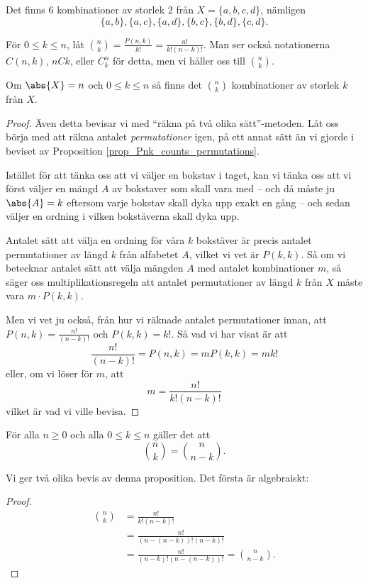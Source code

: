 \documentclass{tufte-handout}
\begin{document}
\begin{example}
	Det finns $6$ kombinationer av storlek $2$ från $X = \{a,b,c,d\}$, nämligen
	$$\{a,b\}, \{a,c\},\{a,d\},\{b,c\},\{b,d\},\{c,d\}.$$
\end{example}

\begin{definition}
	För $0 \leq k \leq n$, låt $\binom{n}{k} = \frac{P(n,k)}{k!} = \frac{n!}{k!(n-k)!}$. Man ser också notationerna $C(n,k)$, $nCk$, eller $C^n_k$ för detta, men vi håller oss till $\binom{n}{k}$. 
\end{definition}

\begin{proposition}
	Om $\abs{X} = n$ och $0 \leq k \leq n$ så finns det $\binom{n}{k}$ kombinationer av storlek $k$ från $X$.
	\begin{proof}
		Även detta bevisar vi med ``räkna på två olika sätt''-metoden. Låt oss börja med att räkna antalet \emph{permutationer} igen, på ett annat sätt än vi gjorde i beviset av Proposition \ref{prop_Pnk_counts_permutations}.

		Istället för att tänka oss att vi väljer en bokstav i taget, kan vi tänka oss att vi först väljer en mängd $A$ av bokstaver som skall vara med -- och då måste ju $\abs{A} = k$ eftersom varje bokstav skall dyka upp exakt en gång -- och sedan väljer en ordning i vilken bokstäverna skall dyka upp.

		Antalet sätt att välja en ordning för våra $k$ bokstäver är precis antalet permutationer av längd $k$ från alfabetet $A$, vilket vi vet är $P(k,k)$. Så om vi betecknar antalet sätt att välja mängden $A$ med antalet kombinationer $m$, så säger oss multiplikationsregeln att antalet permutationer av längd $k$ från $X$ måste vara $m\cdot P(k,k)$.

		Men vi vet ju också, från hur vi räknade antalet permutationer innan, att $P(n,k) = \frac{n!}{(n-k)!}$ och $P(k,k) = k!$. Så vad vi har visat är att
		$$\frac{n!}{(n-k)!} = P(n,k) = m P(k,k) = m k!$$
		eller, om vi löser för $m$, att
		$$m = \frac{n!}{k!(n-k)!}$$
		vilket är vad vi ville bevisa.
	\end{proof}
\end{proposition}

\begin{proposition}
	För alla $n \geq 0$ och alla $0 \leq k \leq n$ gäller det att
	$$\binom{n}{k} = \binom{n}{n-k}.$$
\end{proposition}

Vi ger två olika bevis av denna proposition. Det första är algebraiskt:
\begin{proof}
	\begin{align*}
		\binom{n}{k} &= \frac{n!}{k!(n-k)!}\\
		&= \frac{n!}{(n-(n-k))!(n-k)!}\\
		&= \frac{n!}{(n-k)!(n-(n-k))!} = \binom{n}{n-k}.
	\end{align*}
\end{proof}
\end{document}
